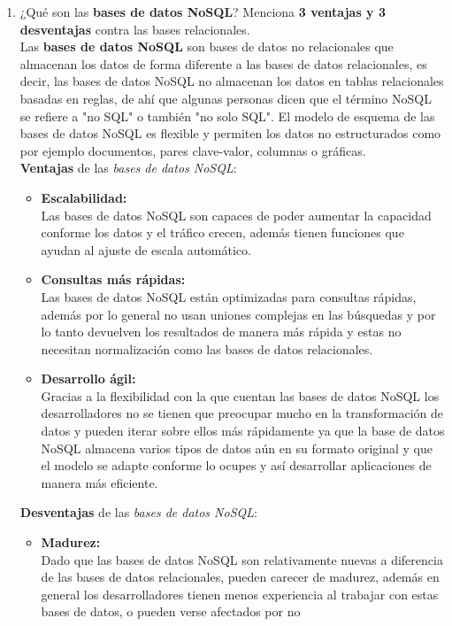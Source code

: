 \documentclass[12pt]{report}
\begin{document}
\begin{enumerate}[label=\roman*.]
\begin{enumerate}[label=\textbf{\arabic*.}, itemsep=2.0em]
  \item ¿Qué son las \textbf{bases de datos NoSQL}? Menciona \textbf{3 ventajas y 3 desventajas} contra las bases relacionales.\\
  Las \textbf{bases de datos NoSQL} son bases de datos no relacionales que almacenan los datos de forma diferente a las bases de datos 
  relacionales, es decir, las bases de datos NoSQL no almacenan los datos en tablas relacionales basadas en reglas, de ahí que algunas 
  personas dicen que el término NoSQL se refiere a "no SQL" o también "no solo SQL". El modelo de esquema de las bases de datos NoSQL es 
  flexible y permiten los datos no estructurados como por ejemplo documentos, pares clave-valor, columnas o gráficas.\\
  \textbf{Ventajas} de las \textit{bases de datos NoSQL}:
  \begin{itemize}
      \item \textbf{Escalabilidad:\\} 
      Las bases de datos NoSQL son capaces de poder aumentar la capacidad conforme los datos y el tráfico crecen, además tienen funciones 
      que ayudan al ajuste de escala automático.
      \item \textbf{Consultas más rápidas:\\} 
      Las bases de datos NoSQL están optimizadas para consultas rápidas, además por lo general no usan uniones complejas en las búsquedas 
      y por lo tanto devuelven los resultados de manera más rápida y estas no necesitan normalización como las bases de datos relacionales.
      \item \textbf{Desarrollo ágil:\\} 
      Gracias a la flexibilidad con la que cuentan las bases de datos NoSQL los desarrolladores no se tienen que preocupar mucho en la 
      transformación de datos y pueden iterar sobre ellos más rápidamente ya que la base de datos NoSQL almacena varios tipos de datos aún 
      en su formato original y que el modelo se adapte conforme lo ocupes y así desarrollar aplicaciones de manera más eficiente.
  \end{itemize}
  \textbf{Desventajas} de las \textit{bases de datos NoSQL}:
  \begin{itemize}
      \item \textbf{Madurez:\\} 
      Dado que las bases de datos NoSQL son relativamente nuevas a diferencia de las bases de datos relacionales, pueden carecer de madurez, 
      además en general los desarrolladores tienen menos experiencia al trabajar con estas bases de datos, o pueden verse afectados por no 

\end{itemize}
\end{enumerate}
\end{enumerate}
\end{document}

